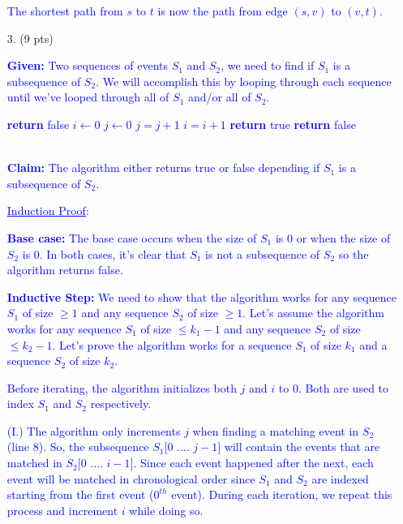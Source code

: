 \documentclass[11pt]{article}
\begin{document}
\begin{itemize}
\textcolor{blue}{ The shortest path from $s$ to $t$ is now the path from edge $(s, v)$ to $(v,t)$.}


\item[$3.$] (9 pts)

\textcolor{blue}{{\bf Given:} Two sequences of events $S_1$ and $S_2$, we need to find if $S_1$ is a subsequence of $S_2$. We will accomplish this by looping through each sequence until we've looped through all of $S_1$ and/or all of $S_2$.}

\textcolor{blue}{
\begin{algorithmic}[1]
		\State \textbf{return} false
	\EndIf
	\State $i \gets 0$
	\State $j \gets 0$
			\State $j = j + 1$
		\EndIf
		\State $i = i + 1$
	\EndWhile
		\State \textbf{return} true
	\Else
		\State \textbf{return} false
	\EndIf
\EndFunction 
\end{algorithmic}
}
\-\\
\textcolor{blue}{{\bf Claim:} The algorithm either returns true or false depending if $S_1$ is a subsequence of $S_2$.}

\textcolor{blue}{ \underline{Induction Proof}:}

\textcolor{blue}{{\bf Base case:} The base case occurs when the size of $S_1$ is 0 or when the size of $S_2$ is 0. In both cases, it's clear that $S_1$ is not a subsequence of $S_2$ so the algorithm returns false.}

\textcolor{blue}{{\bf Inductive Step:} We need to show that the algorithm works for any sequence $S_1$ of size $\geq 1$ and any sequence $S_2$ of size $\geq 1$. Let's assume the algorithm works for any sequence $S_1$ of size $\leq k_1 - 1$ and any sequence $S_2$ of size $\leq k_2 - 1$. Let's prove the algorithm works for a sequence $S_1$ of size $k_1$ and a sequence $S_2$ of size $k_2$.}

\textcolor{blue}{ Before iterating, the algorithm initializes both $j$ and $i$ to 0. Both are used to index $S_1$ and $S_2$ respectively.}

\textcolor{blue}{ (I.) The algorithm only increments $j$ when finding a matching event in $S_2$ (line 8). So, the subsequence $S_1[0$ .... $j-1]$ will contain the events that are matched in $S_2[0$ .... $i-1]$. Since each event happened after the next, each event will be matched in chronological order since $S_1$ and $S_2$ are indexed starting from the first event ($0^{th}$ event). During each iteration, we repeat this process and increment $i$ while doing so.}


\end{itemize}
\end{document}
